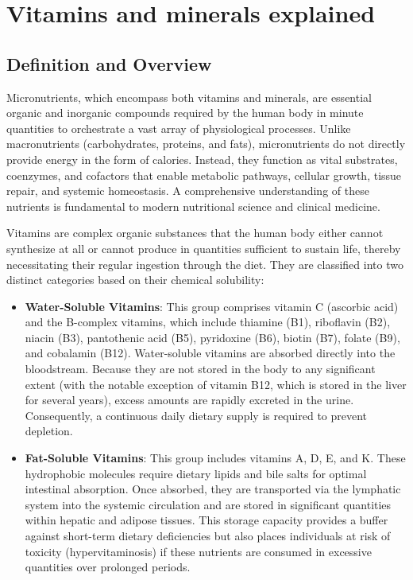 \chapter{Vitamins and minerals explained}

\section*{Definition and Overview}
Micronutrients, which encompass both vitamins and minerals, are essential organic and inorganic compounds required by the human body in minute quantities to orchestrate a vast array of physiological processes. Unlike macronutrients (carbohydrates, proteins, and fats), micronutrients do not directly provide energy in the form of calories. Instead, they function as vital substrates, coenzymes, and cofactors that enable metabolic pathways, cellular growth, tissue repair, and systemic homeostasis. A comprehensive understanding of these nutrients is fundamental to modern nutritional science and clinical medicine.

Vitamins are complex organic substances that the human body either cannot synthesize at all or cannot produce in quantities sufficient to sustain life, thereby necessitating their regular ingestion through the diet. They are classified into two distinct categories based on their chemical solubility:
\begin{itemize}
\item \textbf{Water-Soluble Vitamins}: This group comprises vitamin C (ascorbic acid) and the B-complex vitamins, which include thiamine (B1), riboflavin (B2), niacin (B3), pantothenic acid (B5), pyridoxine (B6), biotin (B7), folate (B9), and cobalamin (B12). Water-soluble vitamins are absorbed directly into the bloodstream. Because they are not stored in the body to any significant extent (with the notable exception of vitamin B12, which is stored in the liver for several years), excess amounts are rapidly excreted in the urine. Consequently, a continuous daily dietary supply is required to prevent depletion.
\item \textbf{Fat-Soluble Vitamins}: This group includes vitamins A, D, E, and K. These hydrophobic molecules require dietary lipids and bile salts for optimal intestinal absorption. Once absorbed, they are transported via the lymphatic system into the systemic circulation and are stored in significant quantities within hepatic and adipose tissues. This storage capacity provides a buffer against short-term dietary deficiencies but also places individuals at risk of toxicity (hypervitaminosis) if these nutrients are consumed in excessive quantities over prolonged periods.
\end{itemize}

